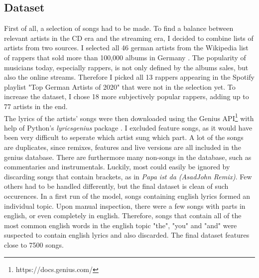 \documentclass[conference]{IEEEtran}
\begin{document}
\subsection{Dataset}
First of all, a selection of songs had to be made. To find a balance between relevant artists in the CD era and the streaming era, I decided to combine lists of artists from two sources. I selected all 46 german artists from the Wikipedia list of rappers that sold more than 100,000 albums in Germany \cite{wiki_albums}. The popularity of musicians today, especially rappers, is not only defined by the albums sales, but also the online streams. Therefore I picked all 13 rappers appearing in the Spotify playlist "Top German Artists of 2020" \cite{spotify_2020} that were not in the selection yet. To increase the dataset, I chose 18 more subjectively popular rappers, adding up to 77 artists in the end.\\
The lyrics of the artists' songs were then downloaded using the Genius API\footnote{https://docs.genius.com/} with help of Python's \textit{lyricsgenius} package \cite{lyricsgenius}. I excluded feature songs, as it would have been very difficult to seperate which artist sung which part. A lot of the songs are duplicates, since remixes, features and live versions are all included in the genius database. There are furthermore many non-songs in the database, such as commentaries and instrumentals. Luckily, most could easily be ignored by discarding songs that contain brackets, as in \textit{Papa ist da (AsadJohn Remix)}. Few others had to be handled differently, but the final dataset is clean of such occurences. In a first run of the model, songs containing english lyrics formed an individual topic. Upon manual inspection, there were a few songs with parts in english, or even completely in english. Therefore, songs that contain all of the most common english words in the english topic "the", "you" and "and" were suspected to contain english lyrics and also discarded. The final dataset features close to 7500 songs.
\end{document}
